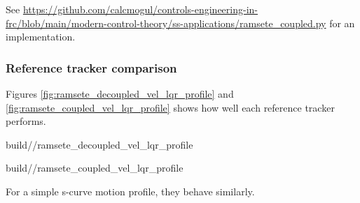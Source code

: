 See
\url{https://github.com/calcmogul/controls-engineering-in-frc/blob/main/modern-control-theory/ss-applications/ramsete_coupled.py}
for an implementation.

\subsubsection{Reference tracker comparison}

Figures \ref{fig:ramsete_decoupled_vel_lqr_profile} and
\ref{fig:ramsete_coupled_vel_lqr_profile} shows how well each \gls{reference}
tracker performs.
\begin{bookfigure}
  \begin{minisvg}{2}{build/\chapterpath/ramsete_decoupled_vel_lqr_profile}
    \caption{Left/right velocity reference tracker response to a motion profile}
    \label{fig:ramsete_decoupled_vel_lqr_profile}
  \end{minisvg}
  \hfill
  \begin{minisvg}{2}{build/\chapterpath/ramsete_coupled_vel_lqr_profile}
    \caption{Linear/angular velocity reference tracker response to a motion
      profile}
    \label{fig:ramsete_coupled_vel_lqr_profile}
  \end{minisvg}
\end{bookfigure}

For a simple s-curve motion profile, they behave similarly.

